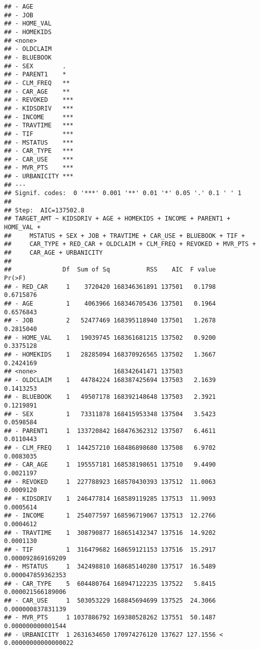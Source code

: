 \documentclass[
]{article}
\begin{document}
\begin{verbatim}
## - AGE           
## - JOB           
## - HOME_VAL      
## - HOMEKIDS      
## <none>          
## - OLDCLAIM      
## - BLUEBOOK      
## - SEX        .  
## - PARENT1    *  
## - CLM_FREQ   ** 
## - CAR_AGE    ** 
## - REVOKED    ***
## - KIDSDRIV   ***
## - INCOME     ***
## - TRAVTIME   ***
## - TIF        ***
## - MSTATUS    ***
## - CAR_TYPE   ***
## - CAR_USE    ***
## - MVR_PTS    ***
## - URBANICITY ***
## ---
## Signif. codes:  0 '***' 0.001 '**' 0.01 '*' 0.05 '.' 0.1 ' ' 1
## 
## Step:  AIC=137502.8
## TARGET_AMT ~ KIDSDRIV + AGE + HOMEKIDS + INCOME + PARENT1 + HOME_VAL + 
##     MSTATUS + SEX + JOB + TRAVTIME + CAR_USE + BLUEBOOK + TIF + 
##     CAR_TYPE + RED_CAR + OLDCLAIM + CLM_FREQ + REVOKED + MVR_PTS + 
##     CAR_AGE + URBANICITY
## 
##              Df  Sum of Sq          RSS    AIC  F value                Pr(>F)
## - RED_CAR     1    3720420 168346361891 137501   0.1798             0.6715876
## - AGE         1    4063966 168346705436 137501   0.1964             0.6576843
## - JOB         2   52477469 168395118940 137501   1.2678             0.2815040
## - HOME_VAL    1   19039745 168361681215 137502   0.9200             0.3375128
## - HOMEKIDS    1   28285094 168370926565 137502   1.3667             0.2424169
## <none>                     168342641471 137503                               
## - OLDCLAIM    1   44784224 168387425694 137503   2.1639             0.1413253
## - BLUEBOOK    1   49507178 168392148648 137503   2.3921             0.1219891
## - SEX         1   73311878 168415953348 137504   3.5423             0.0598584
## - PARENT1     1  133720842 168476362312 137507   6.4611             0.0110443
## - CLM_FREQ    1  144257210 168486898680 137508   6.9702             0.0083035
## - CAR_AGE     1  195557181 168538198651 137510   9.4490             0.0021197
## - REVOKED     1  227788923 168570430393 137512  11.0063             0.0009120
## - KIDSDRIV    1  246477814 168589119285 137513  11.9093             0.0005614
## - INCOME      1  254077597 168596719067 137513  12.2766             0.0004612
## - TRAVTIME    1  308790877 168651432347 137516  14.9202             0.0001130
## - TIF         1  316479682 168659121153 137516  15.2917     0.000092869169209
## - MSTATUS     1  342498810 168685140280 137517  16.5489     0.000047859362353
## - CAR_TYPE    5  604480764 168947122235 137522   5.8415     0.000021566189006
## - CAR_USE     1  503053229 168845694699 137525  24.3066     0.000000837831139
## - MVR_PTS     1 1037886792 169380528262 137551  50.1487     0.000000000001544
## - URBANICITY  1 2631634650 170974276120 137627 127.1556 < 0.00000000000000022

\end{verbatim}
\end{document}
